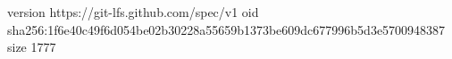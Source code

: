 version https://git-lfs.github.com/spec/v1
oid sha256:1f6e40c49f6d054be02b30228a55659b1373be609dc677996b5d3e5700948387
size 1777
